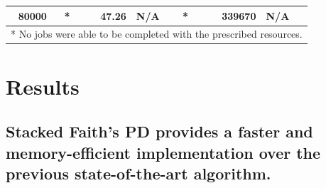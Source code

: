 \begin{table}
\begin{tabular}{|c|rrr|rrr|}
\textbf{80000}         & \multicolumn{1}{l|}{*}              & \multicolumn{1}{r|}{47.26}          & \multicolumn{1}{l|}{N/A}                  & \multicolumn{1}{l|}{*}              & \multicolumn{1}{r|}{339670}         & \multicolumn{1}{l|}{N/A}                      \\ \hline
\multicolumn{7}{l}{* No jobs were able to be completed with the prescribed resources.}
\end{tabular}
\end{table}


\section{Results}
\subsection{Stacked Faith's PD provides a faster and memory-efficient implementation over the previous state-of-the-art algorithm.}

